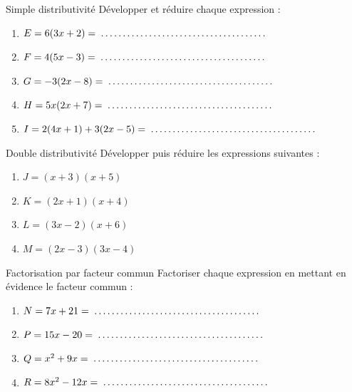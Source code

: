 \begin{exercice}[3 pts]{\capRealiser}{Simple distributivité}
Développer et réduire chaque expression :
\begin{enumerate}
    \item $E = 6(3x + 2) = \pointille[6cm]$
    \item $F = 4(5x - 3) = \pointille[6cm]$
    \item $G = -3(2x - 8) = \pointille[6cm]$
    \item $H = 5x(2x + 7) = \pointille[6cm]$
    \item $I = 2(4x + 1) + 3(2x - 5) = \pointille[6cm]$
\end{enumerate}
\end{exercice}

\begin{exercice}[3 pts]{\capRealiser}{Double distributivité}
Développer puis réduire les expressions suivantes :
\begin{enumerate}
    \item $J = (x + 3)(x + 5)$
    \item $K = (2x + 1)(x + 4)$
    \item $L = (3x - 2)(x + 6)$
    \item $M = (2x - 3)(3x - 4)$
\end{enumerate}
\lignesreponse[6]
\end{exercice}

\begin{exercice}[3 pts]{\capRealiser}{Factorisation par facteur commun}
Factoriser chaque expression en mettant en évidence le facteur commun :
\begin{enumerate}
    \item $N = 7x + 21 = \pointille[6cm]$
    \item $P = 15x - 20 = \pointille[6cm]$
    \item $Q = x^2 + 9x = \pointille[6cm]$
    \item $R = 8x^2 - 12x = \pointille[6cm]$
\end{enumerate}
\end{exercice}

